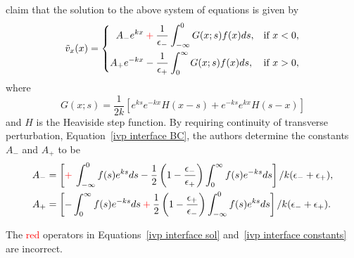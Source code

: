 \documentclass[12pt]{../style-files/ociamthesis}
\begin{document}
\cite{rae_etal81} claim that the solution to the above system of equations is given by 
\begin{equation}
\tilde{v}_x(x) = \left\{
\begin{aligned}
A_-e^{kx}  \: \textcolor{red}{+} \: \frac{1}{\epsilon_-} & \int_{-\infty}^{0} G(x;s)f(x)ds, & \text{if  } x<0,\\
A_+e^{-kx} - \frac{1}{\epsilon_+} & \int_{0}^{\infty} G(x;s)f(x)ds, & \text{if  } x>0,
\end{aligned}
\right.
\label{ivp interface sol}
\end{equation}
where
\begin{equation}
G(x;s) = \frac{1}{2k}[e^{ks}e^{-kx}H(x-s) + e^{-ks}e^{kx}H(s-x)]
\end{equation}
and $H$ is the Heaviside step function. By requiring continuity of transverse perturbation, Equation~\eqref{ivp interface BC}, the authors determine the constants $A_-$ and $A_+$ to be
\begin{align}
A_- & = \left[\textcolor{red}{+} \: \int_{-\infty}^0 f(s)e^{ks} ds - \frac{1}{2}\left(1 - \frac{\epsilon_-}{\epsilon_+}\right)\int_0^\infty f(s)e^{-ks} ds\right] / k(\epsilon_- + \epsilon_+), \\
A_+ & = \left[-\int_0^\infty f(s)e^{-ks} ds \: \textcolor{red}{+} \: \frac{1}{2}\left(1 - \frac{\epsilon_+}{\epsilon_-}\right)\int_{-\infty}^0 f(s)e^{ks} ds\right] / k(\epsilon_- + \epsilon_+).
\label{ivp interface constants}
\end{align}

The \textcolor{red}{red} operators in Equations~\eqref{ivp interface sol} and~\eqref{ivp interface constants} are incorrect.
\end{document}
